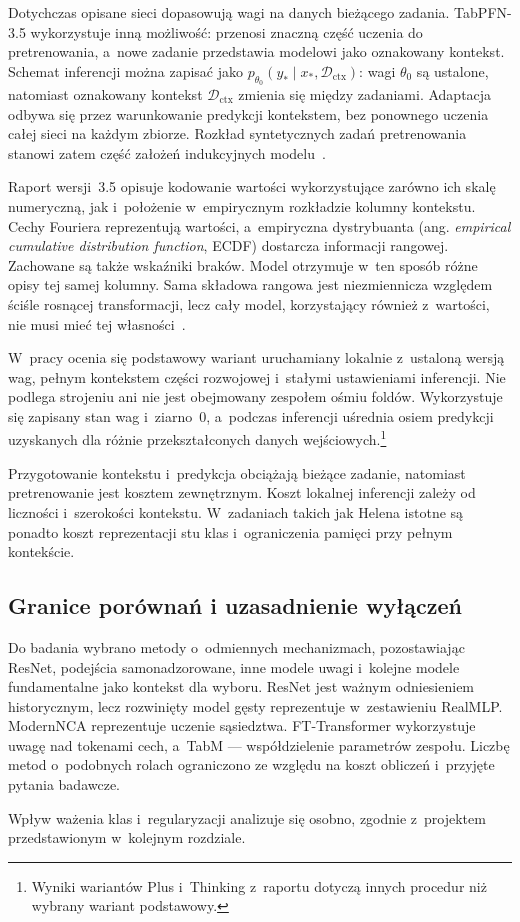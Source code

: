 Dotychczas opisane sieci dopasowują wagi na danych bieżącego zadania. TabPFN-3.5 wykorzystuje inną możliwość: przenosi znaczną część uczenia do pretrenowania, a~nowe zadanie przedstawia modelowi jako oznakowany kontekst. Schemat inferencji można zapisać jako $p_{\theta_0}(y_*\mid x_*,\mathcal{D}_{\mathrm{ctx}})$: wagi $\theta_0$ są ustalone, natomiast oznakowany kontekst $\mathcal{D}_{\mathrm{ctx}}$ zmienia się między zadaniami. Adaptacja odbywa się przez warunkowanie predykcji kontekstem, bez ponownego uczenia całej sieci na każdym zbiorze. Rozkład syntetycznych zadań pretrenowania stanowi zatem część założeń indukcyjnych modelu~\cite{jaeger2026tabpfn35}.

Raport wersji~3.5 opisuje kodowanie wartości wykorzystujące zarówno ich skalę numeryczną, jak i~położenie w~empirycznym rozkładzie kolumny kontekstu. Cechy Fouriera reprezentują wartości, a~empiryczna dystrybuanta (ang. \textit{empirical cumulative distribution function}, ECDF) dostarcza informacji rangowej. Zachowane są także wskaźniki braków. Model otrzymuje w~ten sposób różne opisy tej samej kolumny. Sama składowa rangowa jest niezmiennicza względem ściśle rosnącej transformacji, lecz cały model, korzystający również z~wartości, nie musi mieć tej własności~\cite{jaeger2026tabpfn35}.

W~pracy ocenia się podstawowy wariant uruchamiany lokalnie z~ustaloną wersją wag, pełnym kontekstem części rozwojowej i~stałymi ustawieniami inferencji. Nie podlega strojeniu ani nie jest obejmowany zespołem ośmiu foldów. Wykorzystuje się zapisany stan wag  i~ziarno~0, a~podczas inferencji uśrednia osiem predykcji uzyskanych dla różnie przekształconych danych wejściowych.\footnote{Wyniki wariantów Plus i~Thinking z~raportu dotyczą innych procedur niż wybrany wariant podstawowy.}

Przygotowanie kontekstu i~predykcja obciążają bieżące zadanie, natomiast pretrenowanie jest kosztem zewnętrznym. Koszt lokalnej inferencji zależy od liczności i~szerokości kontekstu. W~zadaniach takich jak Helena istotne są ponadto koszt reprezentacji stu klas i~ograniczenia pamięci przy pełnym kontekście.

\subsection{Granice porównań i uzasadnienie wyłączeń}
\label{sec:granice-metod}

Do badania wybrano metody o~odmiennych mechanizmach, pozostawiając ResNet, podejścia samonadzorowane, inne modele uwagi i~kolejne modele fundamentalne jako kontekst dla wyboru. ResNet jest ważnym odniesieniem historycznym, lecz rozwinięty model gęsty reprezentuje w~zestawieniu RealMLP. ModernNCA reprezentuje uczenie sąsiedztwa. FT-Transformer wykorzystuje uwagę nad tokenami cech, a~TabM --- współdzielenie parametrów zespołu. Liczbę metod o~podobnych rolach ograniczono ze względu na koszt obliczeń i~przyjęte pytania badawcze.

Wpływ ważenia klas i~regularyzacji analizuje się osobno, zgodnie z~projektem przedstawionym w~kolejnym rozdziale.
